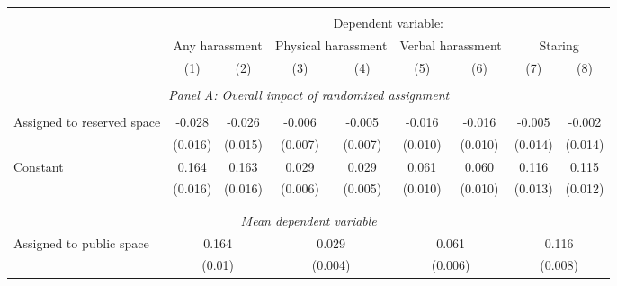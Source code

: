 \begin{tabular}{l*{8}{c}} \hline\hline \\[-1.8ex] & \multicolumn{8}{c}{Dependent variable: } \\ 
                    &\multicolumn{2}{c}{Any harassment}         &\multicolumn{2}{c}{Physical harassment}    &\multicolumn{2}{c}{Verbal harassment}      &\multicolumn{2}{c}{Staring}                \\\cmidrule(lr){2-3}\cmidrule(lr){4-5}\cmidrule(lr){6-7}\cmidrule(lr){8-9}
                    &\multicolumn{1}{c}{(1)}         &\multicolumn{1}{c}{(2)}         &\multicolumn{1}{c}{(3)}         &\multicolumn{1}{c}{(4)}         &\multicolumn{1}{c}{(5)}         &\multicolumn{1}{c}{(6)}         &\multicolumn{1}{c}{(7)}         &\multicolumn{1}{c}{(8)}         \\
 \hline \\[-1ex] \multicolumn{9}{c}{\textit{Panel A: Overall impact of randomized assignment}} \\\\[-1ex]
Assigned to reserved space&      -0.028\sym{*}  &      -0.026\sym{*}  &      -0.006         &      -0.005         &      -0.016         &      -0.016         &      -0.005         &      -0.002         \\
                    &     (0.016)         &     (0.015)         &     (0.007)         &     (0.007)         &     (0.010)         &     (0.010)         &     (0.014)         &     (0.014)         \\
[1em]
Constant            &       0.164\sym{***}&       0.163\sym{***}&       0.029\sym{***}&       0.029\sym{***}&       0.061\sym{***}&       0.060\sym{***}&       0.116\sym{***}&       0.115\sym{***}\\
                    &     (0.016)         &     (0.016)         &     (0.006)         &     (0.005)         &     (0.010)         &     (0.010)         &     (0.013)         &     (0.012)         \\
\\[-1.8ex] \hline \\[-1.8ex] \multicolumn{9}{c}{\textit{Mean dependent variable}} \\ Assigned to public space & \multicolumn{2}{c}{0.164} & \multicolumn{2}{c}{0.029} & \multicolumn{2}{c}{0.061} & \multicolumn{2}{c}{0.116} \\ \, & \multicolumn{2}{c}{(0.01)} & \multicolumn{2}{c}{(0.004)} & \multicolumn{2}{c}{(0.006)} & \multicolumn{2}{c}{(0.008)} \\ 


\end{tabular}
